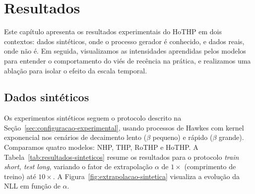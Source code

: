 \chapter{Resultados}
\label{chap:resultados}

Este capítulo apresenta os resultados experimentais do HoTHP em dois contextos: dados sintéticos, onde o processo gerador é conhecido, e dados reais, onde não é. Em seguida, visualizamos as intensidades aprendidas pelos modelos para entender o comportamento do viés de recência na prática, e realizamos uma ablação para isolar o efeito da escala temporal.

\section{Dados sintéticos}
\label{sec:resultados-sinteticos}

Os experimentos sintéticos seguem o protocolo descrito na Seção~\ref{sec:configuracao-experimental}, usando processos de Hawkes com kernel exponencial nos cenários de decaimento lento ($\beta$ pequeno) e rápido ($\beta$ grande). Comparamos quatro modelos: NHP, THP, RoTHP e HoTHP. A Tabela~\ref{tab:resultados-sinteticos} resume os resultados para o protocolo \textit{train short, test long}, variando o fator de extrapolação $\alpha$ de $1\times$ (comprimento de treino) até $10\times$. A Figura~\ref{fig:extrapolacao-sintetica} visualiza a evolução da NLL em função de $\alpha$.

